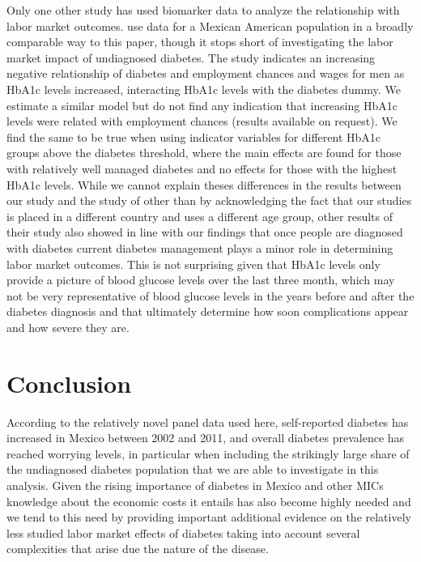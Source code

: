 \documentclass[12pt,english,british]{article}
\begin{document}
Only one other study has used biomarker data to analyze the relationship with labor market outcomes. \citet{BrownIII2011} use data for a Mexican American
population in a broadly comparable way to this paper, though it stops short of investigating
the labor market impact of undiagnosed diabetes. The study indicates
an increasing negative relationship of diabetes and employment
chances and wages for men as \ac{HbA1c} levels increased, interacting \ac{HbA1c} levels
with the diabetes dummy. We estimate a similar model but
do not find any indication that increasing \ac{HbA1c} levels were
related with employment chances (results available on request). We
find the same to be true when using indicator variables for different
\ac{HbA1c} groups above the diabetes threshold, where the main effects
are found for those with relatively well managed diabetes and no
effects for those with the highest \ac{HbA1c} levels. While we cannot explain theses differences in the results between our study and the study of \citet{BrownIII2011} other than by acknowledging the fact that our studies is placed in a different country and uses a different age group, other results of their study also showed in line with our findings that once people are diagnosed with diabetes current diabetes management plays a minor role in determining labor market outcomes. This is not surprising given that \ac{HbA1c} levels only provide a picture of blood glucose levels over the last three month, which may not be very representative of blood glucose levels in the years before and after the diabetes diagnosis and that ultimately determine how soon complications appear and how severe they are.



\section{\label{sec:Conclusion}Conclusion}

According to the relatively novel panel data used here, self-reported diabetes has increased in Mexico between 2002 and 2011, and overall
diabetes prevalence has reached worrying
levels, in particular when including the strikingly large share of the undiagnosed diabetes population that we are able to investigate in this analysis. Given the rising importance of diabetes in Mexico and other \ac{MICs} knowledge about the economic costs it entails has also become highly needed and we tend to this need by providing important additional evidence on the relatively less studied labor market effects of diabetes taking into account several complexities that arise due the nature of the disease.
\end{document}

